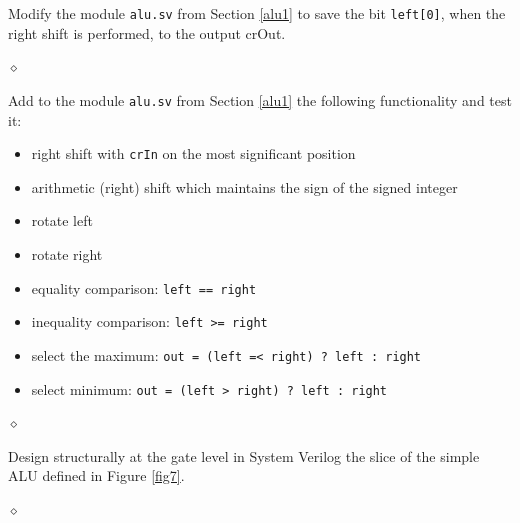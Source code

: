 \begin{problem}
Modify the module {\tt alu.sv} from Section \ref{alu1} to save the bit {\tt left[0]}, when the right shift is performed, to the output crOut.

$\diamond$
\end{problem}


\begin{problem}\label{upgradeALU}
Add to the module {\tt alu.sv} from Section \ref{alu1} the following functionality and test it:
\begin{itemize}
    \item right shift with {\tt crIn} on the most significant position
    \item arithmetic (right) shift which maintains the sign of the signed integer
    \item rotate left
    \item rotate right
    \item equality comparison: {\tt left == right}
    \item inequality comparison: {\tt left >= right}
    \item select the maximum: {\tt out = (left =< right) ? left : right}
    \item select minimum: {\tt out = (left > right) ? left : right}
\end{itemize}

$\diamond$
\end{problem}


\begin{problem}
Design structurally at the gate level in System Verilog the slice of the simple ALU defined in Figure \ref{fig7}.

$\diamond$
\end{problem}

